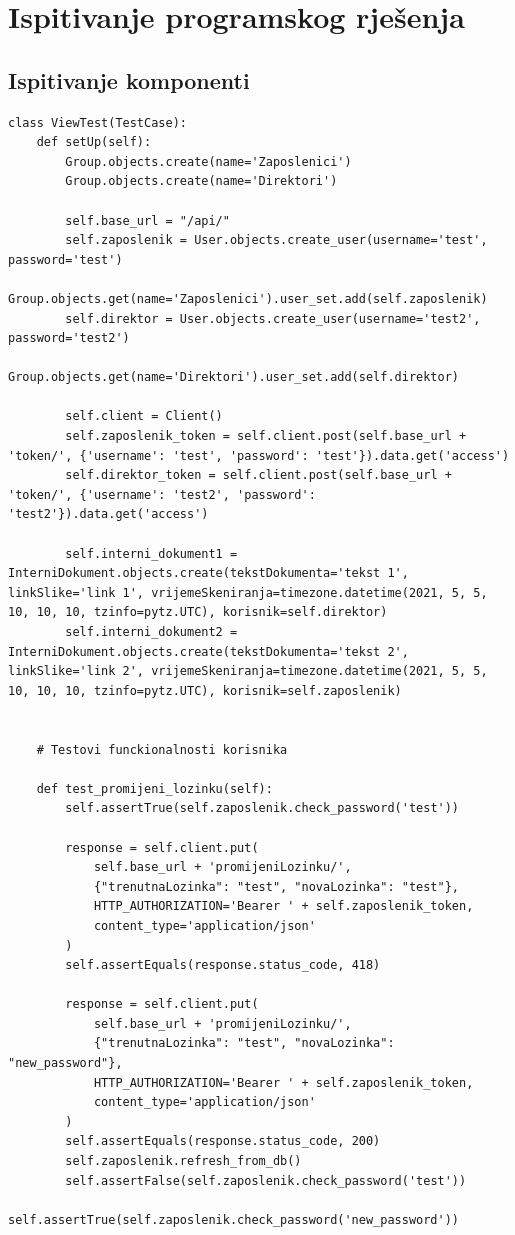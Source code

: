 			
			\eject 
		
	
		\section{Ispitivanje programskog rješenja}
			

			\subsection{Ispitivanje komponenti}
\begin{lstlisting}[breaklines=true]
class ViewTest(TestCase):
	def setUp(self):
		Group.objects.create(name='Zaposlenici')
		Group.objects.create(name='Direktori')

		self.base_url = "/api/"
		self.zaposlenik = User.objects.create_user(username='test', password='test')
		Group.objects.get(name='Zaposlenici').user_set.add(self.zaposlenik)
		self.direktor = User.objects.create_user(username='test2', password='test2')
		Group.objects.get(name='Direktori').user_set.add(self.direktor)

		self.client = Client()
		self.zaposlenik_token = self.client.post(self.base_url + 'token/', {'username': 'test', 'password': 'test'}).data.get('access')
		self.direktor_token = self.client.post(self.base_url + 'token/', {'username': 'test2', 'password': 'test2'}).data.get('access')

		self.interni_dokument1 = InterniDokument.objects.create(tekstDokumenta='tekst 1', linkSlike='link 1', vrijemeSkeniranja=timezone.datetime(2021, 5, 5, 10, 10, 10, tzinfo=pytz.UTC), korisnik=self.direktor)
		self.interni_dokument2 = InterniDokument.objects.create(tekstDokumenta='tekst 2', linkSlike='link 2', vrijemeSkeniranja=timezone.datetime(2021, 5, 5, 10, 10, 10, tzinfo=pytz.UTC), korisnik=self.zaposlenik)


	# Testovi funckionalnosti korisnika

	def test_promijeni_lozinku(self):
		self.assertTrue(self.zaposlenik.check_password('test'))

		response = self.client.put(
			self.base_url + 'promijeniLozinku/',
			{"trenutnaLozinka": "test", "novaLozinka": "test"},
			HTTP_AUTHORIZATION='Bearer ' + self.zaposlenik_token,
			content_type='application/json'
		)
		self.assertEquals(response.status_code, 418)

		response = self.client.put(
			self.base_url + 'promijeniLozinku/',
			{"trenutnaLozinka": "test", "novaLozinka": "new_password"},
			HTTP_AUTHORIZATION='Bearer ' + self.zaposlenik_token,
			content_type='application/json'
		)
		self.assertEquals(response.status_code, 200)
		self.zaposlenik.refresh_from_db()
		self.assertFalse(self.zaposlenik.check_password('test'))
		self.assertTrue(self.zaposlenik.check_password('new_password'))


\end{lstlisting}
